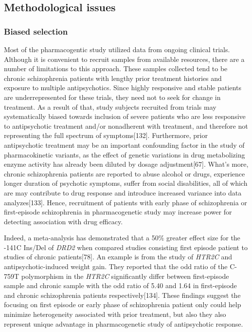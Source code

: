 \documentclass[12pt]{report}
\newcommand{\gene}[1]{\textit{#1}}
\begin{document}
			\subsection{Methodological issues}
			\subsubsection{Biased selection}
				Most of the pharmacogentic study utilized data from ongoing clinical trials. 
				Although it is convenient to recruit samples from available resources, there are a number of limitations to this approach. 
				These samples collected tend to be chronic schizophrenia patients with lengthy prior treatment histories and exposure to multiple antipsychotics. 
				Since highly responsive and stable patients are underrepresented for these trials, they need not to seek for change in treatment. 
				As a result of that, study subjects recruited from trials may systematically biased towards inclusion of severe patients who are less responsive to antipsychotic treatment and/or nonadherent with treatment, and therefore not representing the full spectrum of symptoms[132]. 
				Furthermore, prior antipsychotic treatment may be an important confounding factor in the study of pharmacokinetic variants, as the effect of genetic variations in drug metabolizing enzyme activity has already been diluted by dosage adjustment[67].
				What’s more, chronic schizophrenia patients are reported to abuse alcohol or drugs, experience longer duration of psychotic symptoms, suffer from social disabilities, all of which are may contribute to drug response and introduce increased variance into data analyzes[133]. 
				Hence, recruitment of patients with early phase of schizophrenia or first-episode schizophrenia in pharmacogenetic study may increase power for detecting association with drug efficacy. 
				
				Indeed, a meta-analysis has demonstrated that a 50$\%$ greater effect size for the -141C Ins/Del of \gene{DRD2} when compared studies consisting first episode patient to studies of chronic patients[78].
				An example is from the study of \gene{HTR2C} and antipsychotic-induced weight gain. 
				They reported that the odd ratio of the C-759T polymorphism in the \gene{HTR2C} significantly differ between first-episode sample and chronic sample with the odd ratio of 5.40 and 1.64 in first-episode and chronic schizophrenia patients respectively[134]. 
				These findings suggest the focusing on first episode or early phase of schizophrenia patient only could help minimize heterogeneity associated with prior treatment, but also they also represent unique advantage in pharmacogenetic study of antipsychotic response.      
\end{document}
